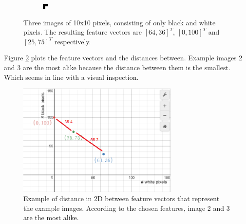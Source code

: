 \documentclass{report}
\begin{document}
\begin{figure}[H]
\begin{subfigure}[b]{0.2\textwidth}
	\end{subfigure}\hfill
	\begin{subfigure}[b]{0.2\textwidth}
		\includegraphics[width=\textwidth]{images/mostlyblack.png}
	\end{subfigure}
	\caption{Three images of 10x10 pixels, consisting of only black and white pixels. The resulting feature vectors are $[64,36]^T$, $[0, 100]^T$ and $[25,75]^T$ respectively.}
	\label{featurevectorimages}
\end{figure}

Figure \ref{fig:distanceexample} plots the feature vectors and the distances between. Example images 2 and 3 are the most alike because the distance between them is the smallest. Which seems in line with a visual inspection.

\begin{figure}[H]
	\includegraphics[width=8cm]{images/distanceexample.png}
	\centering
	\caption{Example of distance in 2D between feature vectors that represent the example images. According to the chosen features, image 2 and 3 are the most alike.}
	\label{fig:distanceexample}
\end{figure}
\end{document}
